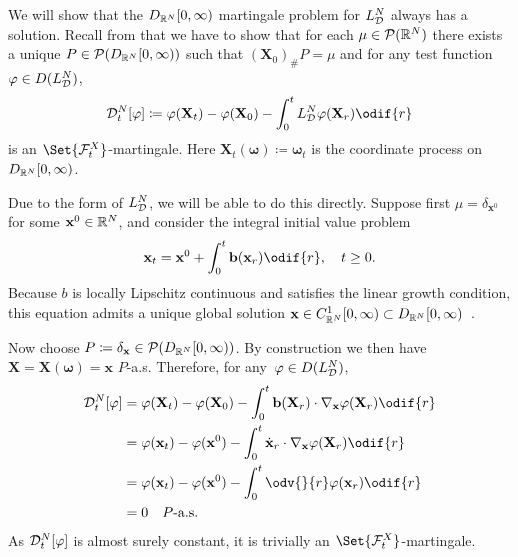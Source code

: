 We will show that the \(D_{\mathbb{R}^N}[0,\infty)\) martingale problem for \(L_{\mathcal{D}}^N\) always has a solution.
Recall from  that we have to show that for each \(\mu \in \mathcal{P}(\mathbb{R}^N)\) there exists a unique \(P \in \mathcal{P}(D_{\mathbb{R}^N}[0,\infty))\) such that \( (\bm{X}_0)_\# P = \mu \) and for any test function \(\varphi \in D(L_{\mathcal{D}}^N)\),
\begin{equation}
  \cD_t^{N}[\varphi]
  \coloneqq \varphi(\bm{X}_t) - \varphi(\bm{X}_0) - \int_0^t L_{\cD}^{N} \varphi(\bm{X}_r) \odif{r}
\end{equation}
is an \(\Set{\cF_t^X}\)-martingale.
Here \(\bm{X}_t(\bm{\omega}) \coloneqq \bm{\omega}_t\) is the coordinate process on \(D_{\mathbb{R}^N}[0,\infty)\).

Due to the form of \(L_{\mathcal{D}}^N\), we will be able to do this directly.
Suppose first \(\mu = \delta_{\bm{x}^0}\) for some \(\mathbf{x}^0 \in \mathbb{R}^N\), and consider the integral initial value problem
\begin{equation}
  \bm{x}_t = \bm{x}^0 + \int_0^t \bm{b}(\bm{x}_r) \odif{r}, \quad t \geq 0.
\end{equation}
Because \(b\) is locally Lipschitz continuous and satisfies the linear growth condition, this equation admits a unique global solution \(\mathbf{x} \in C^1_{\mathbb{R}^N}[0,\infty) \subset D_{\mathbb{R}^N}[0,\infty)\)~\cite{ode_result}.

Now choose \(P \coloneqq \delta_{\mathbf{x}} \in \mathcal{P}(D_{\mathbb{R}^N}[0,\infty))\).
By construction we then have \(\bm{X} = \bm{X}(\bm{\omega}) = \bm{x}\) \(P\)-a.s.
Therefore, for any~\(\varphi \in D(L_{\mathcal{D}}^N)\),
\begin{equation}
  \begin{split}
    \cD_t^{N}[\varphi] & = \varphi(\bm{X}_t) - \varphi(\bm{X}_0) - \int_0^t \bm{b}(\bm{X}_r) \cdot \nabla_{\bm{x}} \varphi(\bm{X}_r) \odif{r} \\
                       & = \varphi(\bm{x}_t) - \varphi(\bm{x}^0) - \int_0^t \dot{\bm{x}}_r \cdot \nabla_{\bm{x}} \varphi(\bm{X}_r) \odif{r}   \\
                       & = \varphi(\bm{x}_t) - \varphi(\bm{x}^0) - \int_0^t \odv{}{r} \varphi(\bm{x}_r) \odif{r}                              \\
                       & = 0 \quad P\text{-a.s.}
  \end{split}
\end{equation}
As \(\mathcal{D}_t^{N}[\varphi]\) is almost surely constant, it is trivially an \(\Set{\cF_t^X}\)-martingale.


